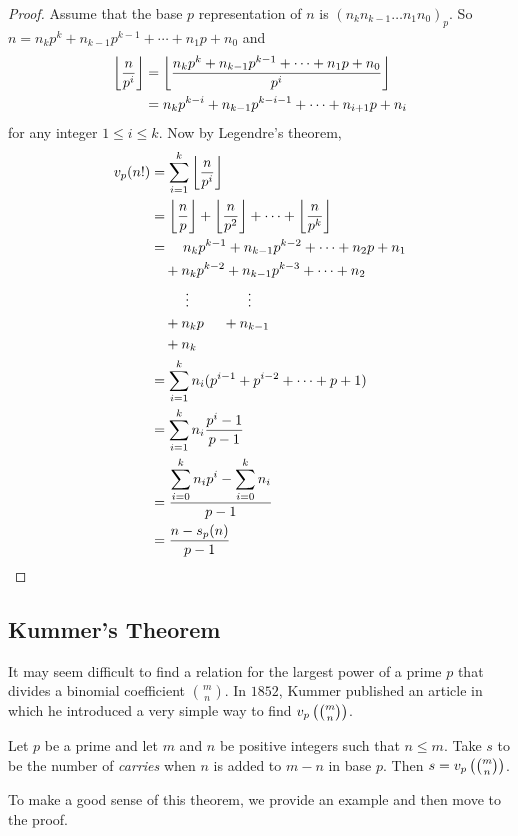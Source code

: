 \begin{proof}
Assume that the base $p$ representation of $n$ is $(n_k n_{k-1}\ldots n_1 n_0)_p$. So $n=n_kp^k + n_{k-1}p^{k-1} + \cdots + n_1 p +n_0$ and
\begin{align*}
	\left\lfloor{\dfrac{n}{p^i}}\right\rfloor
	&=	\left\lfloor{\dfrac{n_kp^k + n_{k-1}p^{k-1} + \cdots + n_1 p +n_0}{p^i}}\right\rfloor\\
	&= n_kp^{k-i} + n_{k-1}p^{k-i-1} + \cdots + n_{i+1} p + n_i
\end{align*}
for any integer $1 \leq i \leq k$. Now by Legendre's theorem,
\begin{align*}
	v_p(n!) & = \sum_{i=1}^{k}\floor{\dfrac{n}{p^i}}\\
	&= \floor{\dfrac{n}{p}}+\floor{\dfrac{n}{p^2}}+\cdots+\floor{\dfrac{n}{p^k}}\\
	&= \ \ \ n_kp^{k-1} + n_{k-1}p^{k-2} + \cdots + n_{2} p + n_1 \\  &\ \ \ + n_kp^{k-2} + n_{k-1}p^{k-3} + \cdots + n_{2}\\ &\ \ \ \ \ \ \ \vdots \qquad\qquad \vdots\\  &\ \ \ + n_kp  \ \ \ \ + n_{k-1} \\&\ \ \ + n_k\\
	&=\sum_{i=1}^k n_i(p^{i-1}+p^{i-2}+\cdots+p+1)\\
	&= \sum_{i=1}^k n_i\frac{p^i-1}{p-1}\\
	&=\displaystyle \frac{\displaystyle \sum\limits_{i=0}^k n_i p^i - \sum\limits_{i=0}^k n_i}{p-1}\\
	&=\frac{n-s_p(n)}{p-1}
\end{align*}
\end{proof}

\subsection{Kummer's Theorem}
It may seem difficult to find a relation for the largest power of a prime $p$ that divides a binomial coefficient $\binom{m}{n}$. In $1852$, Kummer published an article in which he introduced a very simple way to find $v_{p}\left(\binom{m}{n}\right)$.

\begin{theorem}
Let $p$ be a prime and let $m$ and $n$ be positive integers such that $n \leq m$. Take $s$ to be the number of \textit{carries} when $n$ is added to $m-n$ in base $p$. Then $s = v_{p}\left(\binom{m}{n}\right)$.
\end{theorem}

To make a good sense of this theorem, we provide an example and then move to the proof.

